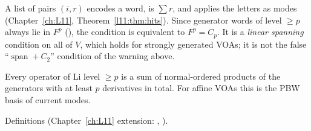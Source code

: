 \begin{dictionary}
A list of pairs $(i,r)$ encodes a word,  is $\sum r$, and  applies the
letters as modes (Chapter~\ref{ch:L11}, Theorem~\ref{l11:thm:hits}). Since generator words of level $\ge p$
always lie in $F^p$ (), the condition is equivalent to $F^p=C_p$. It is a
\emph{linear spanning} condition on all of $V$, which holds for strongly generated VOAs; it is not the
false ``$\operatorname{span}+C_2$'' condition of the warning above.
\end{dictionary}

\begin{physics}
Every operator of Li level $\ge p$ is a sum of normal-ordered products of the generators with at least $p$
derivatives in total. For affine VOAs this is the PBW basis of current modes.
\end{physics}

\begin{status}
Definitions (Chapter~\ref{ch:L11} extension: ,
).
\end{status}

